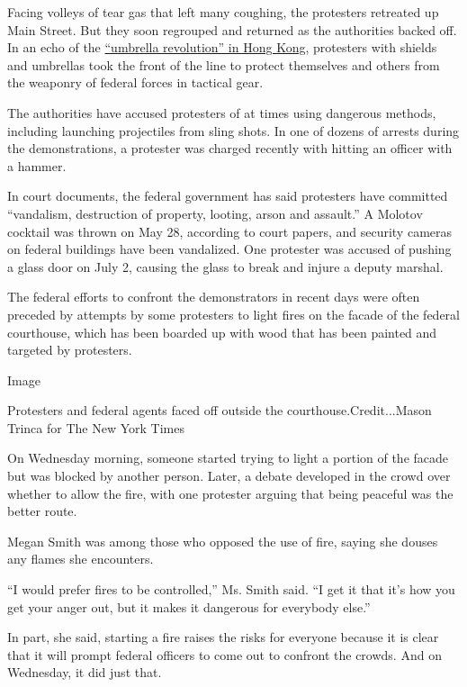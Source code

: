 Facing volleys of tear gas that left many coughing, the protesters
retreated up Main Street. But they soon regrouped and returned as the
authorities backed off. In an echo of the
\href{https://www.nytimes.com/interactive/2014/10/01/world/asia/hong-kong-protest-photos.html}{``umbrella
revolution'' in Hong Kong}, protesters with shields and umbrellas took
the front of the line to protect themselves and others from the weaponry
of federal forces in tactical gear.

The authorities have accused protesters of at times using dangerous
methods, including launching projectiles from sling shots. In one of
dozens of arrests during the demonstrations, a protester was charged
recently with hitting an officer with a hammer.

In court documents, the federal government has said protesters have
committed ``vandalism, destruction of property, looting, arson and
assault.'' A Molotov cocktail was thrown on May 28, according to court
papers, and security cameras on federal buildings have been vandalized.
One protester was accused of pushing a glass door on July 2, causing the
glass to break and injure a deputy marshal.

The federal efforts to confront the demonstrators in recent days were
often preceded by attempts by some protesters to light fires on the
facade of the federal courthouse, which has been boarded up with wood
that has been painted and targeted by protesters.

Image

Protesters and federal agents faced off outside the
courthouse.Credit...Mason Trinca for The New York Times

On Wednesday morning, someone started trying to light a portion of the
facade but was blocked by another person. Later, a debate developed in
the crowd over whether to allow the fire, with one protester arguing
that being peaceful was the better route.

Megan Smith was among those who opposed the use of fire, saying she
douses any flames she encounters.

``I would prefer fires to be controlled,'' Ms. Smith said. ``I get it
that it's how you get your anger out, but it makes it dangerous for
everybody else.''

In part, she said, starting a fire raises the risks for everyone because
it is clear that it will prompt federal officers to come out to confront
the crowds. And on Wednesday, it did just that.

